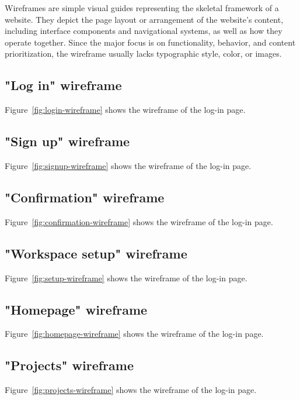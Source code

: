 Wireframes are simple visual guides representing the skeletal framework of a website. \cite{gemayel_how_nodate}
They depict the page layout or arrangement of the website's content, including interface components and navigational systems, as well as how they operate together.
Since the major focus is on functionality, behavior, and content prioritization, the wireframe usually lacks typographic style, color, or images. \cite{garrett_elements_2011}

\subsection{"Log in" wireframe}
Figure~\ref{fig:login-wireframe} shows the wireframe of the log-in page.


\subsection{"Sign up" wireframe}
Figure~\ref{fig:signup-wireframe} shows the wireframe of the log-in page.


\subsection{"Confirmation" wireframe}
Figure~\ref{fig:confirmation-wireframe} shows the wireframe of the log-in page.


\subsection{"Workspace setup" wireframe}
Figure~\ref{fig:setup-wireframe} shows the wireframe of the log-in page.


\subsection{"Homepage" wireframe}
Figure~\ref{fig:homepage-wireframe} shows the wireframe of the log-in page.


\subsection{"Projects" wireframe}
Figure~\ref{fig:projects-wireframe} shows the wireframe of the log-in page.

